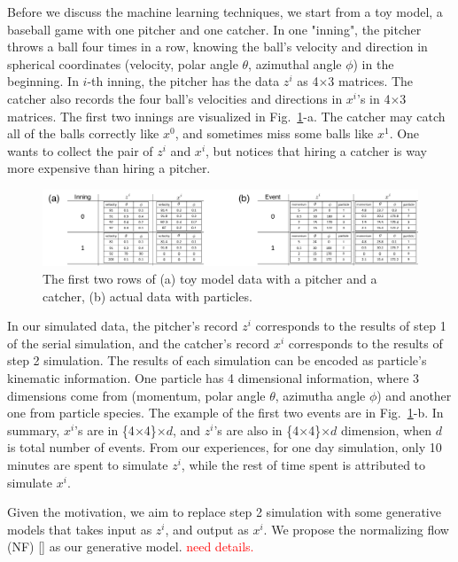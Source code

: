 \documentclass{article}
\begin{document}
\quad Before we discuss the machine learning techniques, we start from a toy model, a baseball game with one pitcher and one catcher. In one "inning", the pitcher throws a ball four times in a row, knowing the ball's velocity and direction in spherical coordinates (velocity, polar angle $\theta$, azimuthal angle $\phi$) in the beginning. In $i$-th inning, the pitcher has the data $z^{i}$ as 4$\times$3 matrices. The catcher also records the four ball's velocities and directions in $x^{i}$'s in 4$\times$3 matrices. The first two innings are visualized in Fig.~\ref{data}-a. The catcher may catch all of the balls correctly like $x^0$, and sometimes miss some balls like $x^1$. One wants to collect the pair of $z^i$ and $x^i$, but notices that hiring a catcher is way more expensive than hiring a pitcher.

\begin{figure}[!hb]
 \centering
   \includegraphics[width=\linewidth]{dataDescription.pdf}
  \caption{The first two rows of (a) toy model data with a pitcher and a catcher, (b) actual data with particles.}
  \label{data}
\end{figure}

\quad In our simulated data, the pitcher's record $z^i$ corresponds to the results of step 1 of the serial simulation, and the catcher's record $x^i$ corresponds to the results of step 2 simulation. The results of each simulation can be encoded as particle's kinematic information. One particle has 4 dimensional information, where 3 dimensions come from (momentum, polar angle $\theta$, azimutha angle $\phi$) and another one from particle species. The example of the first two events are in Fig.~\ref{data}-b. In summary, $x^i$'s are in \{4$\times$4\}$\times d$, and $z^i$'s are also in \{4$\times$4\}$\times d$ dimension, when $d$ is total number of events. From our experiences, for one day simulation, only 10 minutes are spent to simulate $z^i$, while the rest of time spent is attributed to simulate $x^i$.

\quad Given the motivation, we aim to replace step 2 simulation with some generative models that takes input as $z^i$, and output as $x^i$. We propose the normalizing flow (NF) [\citet{9089305, papamakarios2019normalizing}] as our generative model. \textcolor{red}{need details.}
\end{document}
